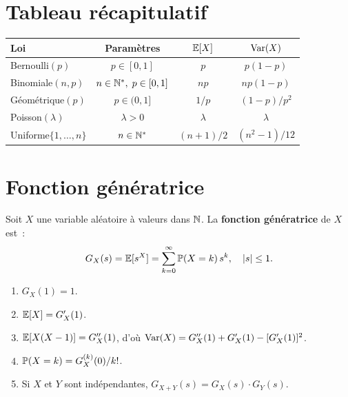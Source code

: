 \section{Tableau r\'ecapitulatif}

\begin{formules}[title=\textbf{Lois discr\`etes fondamentales}]
\begin{center}
\renewcommand{\arraystretch}{1.4}
\begin{tabular}{lccc}
    \toprule
    \textbf{Loi} & \textbf{Param\`etres} & $\mathbb{E}[X]$ & $\mathrm{Var}(X)$ \\
    \midrule
    Bernoulli$(p)$ & $p \in [0,1]$ & $p$ & $p(1-p)$ \\
    Binomiale$(n,p)$ & $n \in \mathbb{N}^*,\; p \in [0,1]$ & $np$ & $np(1-p)$ \\
    G\'eom\'etrique$(p)$ & $p \in (0,1]$ & $1/p$ & $(1-p)/p^2$ \\
    Poisson$(\lambda)$ & $\lambda > 0$ & $\lambda$ & $\lambda$ \\
    Uniforme$\{1,\ldots,n\}$ & $n \in \mathbb{N}^*$ & $(n+1)/2$ & $(n^2-1)/12$ \\
    \bottomrule
\end{tabular}
\end{center}
\end{formules}

\section{Fonction g\'en\'eratrice}

\begin{definition}
Soit $X$ une variable al\'eatoire \`a valeurs dans $\mathbb{N}$. La \textbf{fonction
g\'en\'eratrice} de $X$ est~:
\[
    G_X(s) = \mathbb{E}[s^X] = \sum_{k=0}^{\infty} \mathbb{P}(X = k)\, s^k, \quad \left| s \right| \leq 1.
\]
\end{definition}

\begin{proposition}[Propri\'et\'es de $G_X$]
\begin{enumerate}[label=(\roman*)]
    \item $G_X(1) = 1$.
    \item $\mathbb{E}[X] = G_X'(1)$.
    \item $\mathbb{E}[X(X-1)] = G_X''(1)$, d'o\`u
          $\mathrm{Var}(X) = G_X''(1) + G_X'(1) - [G_X'(1)]^2$.
    \item $\mathbb{P}(X = k) = G_X^{(k)}(0)/k!$.
    \item Si $X$ et $Y$ sont ind\'ependantes, $G_{X+Y}(s) = G_X(s) \cdot G_Y(s)$.
\end{enumerate}
\end{proposition}

